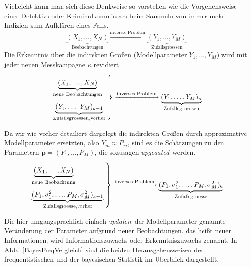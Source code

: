\begin{enumerate}
Vielleicht kann man sich diese Denkweise so vorstellen wie die Vorgehensweise eines Detektivs
oder Kriminalkommissars beim Sammeln von immer mehr Indizien zum Aufklären eines Falls.
\begin{equation}
\underbrace{(X_1, \dots, X_N)}_{\mathrm{Beobachtungen}} \xrightarrow{\mathrm{inverses \; Problem}}
\underbrace{(Y_1, \dots, Y_M)}_{\mathrm{Zufallsgroessen}}
\end{equation}
Die Erkenntnis über die indirekten Größen (Modellparameter $Y_1, \dots, Y_M$) wird mit jeder
neuen Messkampagne $\kappa$ revidiert
\begin{equation}
\arraycolsep=2.4pt\def\arraystretch{2}
\left.
\begin{array}{l}
\underbrace{(X_1, \dots, X_N)}_{\mathrm{neue~Beobachtungen}}\\
\underbrace{(Y_1, \dots, Y_M)_{\kappa-1}}_{\mathrm{Zufallsgroessen, vorher}}
\end{array}\right\}
 \xrightarrow{\mathrm{inverses \; Problem}}
\underbrace{(Y_1, \dots, Y_M)_{\kappa}}_{\mathrm{Zufallsgroessen}}
\end{equation}
\end{enumerate}
Da wir wie vorher detailiert dargelegt die indirekten Größen durch approximative Modellparameter ersetzten,
also $Y_m \approx P_m$, sind es die Schätzungen zu den Parametern $\mathbf{p} = (P_1,\dots,P_M)$, die
sozusagen \glqq\textsl{upgedated}\grqq ~werden.
\begin{equation}
\arraycolsep=2.4pt\def\arraystretch{2}
\left.
\begin{array}{l}
\underbrace{(X_1, \dots, X_N)}_{\mathrm{neue~Beobachtung}}\\
\underbrace{(P_1, \sigma^2_1, \dots, P_M, \sigma^2_M)_{\kappa-1}}_{\mathrm{Zufallsgroesse, vorher}}
\end{array}\right\}
 \xrightarrow{\mathrm{inverses \; Problem}}
\underbrace{(P_1, \sigma^2_1, \dots, P_M, \sigma^2_M)_{\kappa}}_{\mathrm{Zufallsgroesse}}
\end{equation}

Die hier umgangsprachlich einfach \glqq\textsl{updaten}\grqq ~der Modellparameter genannte
Veränderung der Parameter aufgrund neuer Beobachtungen, das heißt neuer Informationen, wird
Informationszuwachs oder Erkenntniszuwachs genannt. In Abb.\ \ref{BayesFreqVergleich}
sind die beiden Heransgehensweisen der frequentistischen und der bayesischen Statistik im
Überblick dargestellt.

